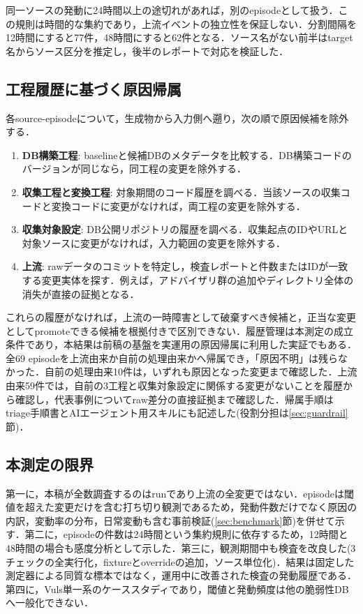 \documentclass{css}
\begin{document}
同一ソースの発動に24時間以上の途切れがあれば，別のepisodeとして扱う．この規則は時間的な集約であり，上流イベントの独立性を保証しない．分割間隔を12時間にすると77件，48時間にすると62件となる．ソース名がない前半はtarget名からソース区分を推定し，後半のレポートで対応を検証した．

\subsection{工程履歴に基づく原因帰属}

各source-episodeについて，生成物から入力側へ遡り，次の順で原因候補を除外する．

\begin{enumerate}
\item \textbf{DB構築工程}: baselineと候補DBのメタデータを比較する．DB構築コードのバージョンが同じなら，同工程の変更を除外する．
\item \textbf{収集工程と変換工程}: 対象期間のコード履歴を調べる．当該ソースの収集コードと変換コードに変更がなければ，両工程の変更を除外する．
\item \textbf{収集対象設定}: DB公開リポジトリの履歴を調べる．収集起点のIDやURLと対象ソースに変更がなければ，入力範囲の変更を除外する．
\item \textbf{上流}: rawデータのコミットを特定し，検査レポートと件数またはIDが一致する変更実体を探す．例えば，アドバイザリ群の追加やディレクトリ全体の消失が直接の証拠となる．
\end{enumerate}

これらの履歴がなければ，上流の一時障害として破棄すべき候補と，正当な変更としてpromoteできる候補を根拠付きで区別できない．履歴管理は本測定の成立条件であり，本結果は前稿の基盤を実運用の原因帰属に利用した実証でもある\cite{nakaoka2025}．全69 episodeを上流由来か自前の処理由来かへ帰属でき，「原因不明」は残らなかった．自前の処理由来10件は，いずれも原因となった変更まで確認した．上流由来59件では，自前の3工程と収集対象設定に関係する変更がないことを履歴から確認し，代表事例についてraw差分の直接証拠まで確認した．帰属手順はtriage手順書とAIエージェント用スキルにも記述した(役割分担は\ref{sec:guardrail}節)．

\subsection{本測定の限界}

第一に，本稿が全数調査するのはrunであり上流の全変更ではない．episodeは閾値を超えた変更だけを含む打ち切り観測であるため，発動件数だけでなく原因の内訳，変動率の分布，日常変動も含む事前検証(\ref{sec:benchmark}節)を併せて示す．第二に，episodeの件数は24時間という集約規則に依存するため，12時間と48時間の場合も感度分析として示した．第三に，観測期間中も検査を改良した(3チェックの全実行化，fixtureとoverrideの追加，ソース単位化)．結果は固定した測定器による同質な標本ではなく，運用中に改善された検査の発動履歴である．第四に，Vuls単一系のケーススタディであり，閾値と発動頻度は他の脆弱性DBへ一般化できない．
\end{document}
